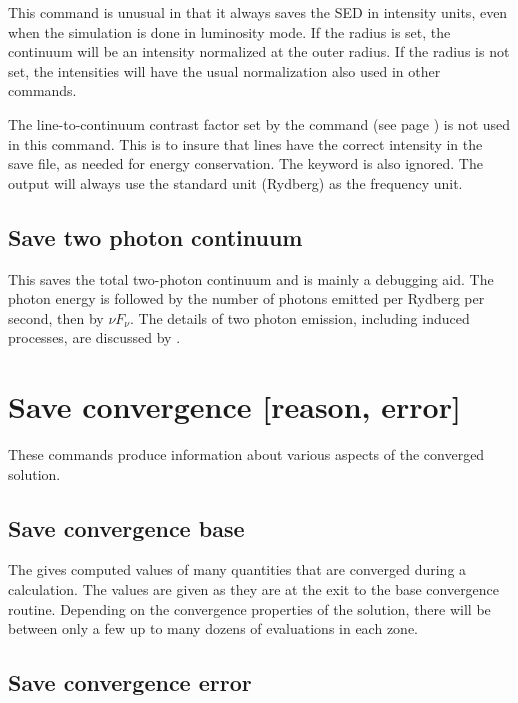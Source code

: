 This command is unusual in that it always saves the SED in intensity units,
even when the simulation is done in luminosity mode. If the radius is set, the
continuum will be an intensity normalized at the outer radius. If the radius
is not set, the intensities will have the usual normalization also used in
other  commands.

The line-to-continuum contrast factor 
set by the  command
(see page \pageref{sec:CommandSetSaveLWidth})
is not used in this command.  This is to insure that lines have
the correct intensity in the save file, as needed for energy conservation.
The  keyword is also ignored. The output will always use
the standard unit (Rydberg) as the frequency unit.

\subsection{Save two photon continuum}

This saves the total two-photon continuum and is mainly a debugging
aid.  The photon energy is followed by the number of photons emitted per
Rydberg per second, then by $\nu F_\nu$.  The details of two photon emission,
including induced processes, are discussed by \citet{Bottorff2006}.

\section{Save convergence [reason, error]}

These commands produce information about various aspects of the converged
solution.

\subsection{Save convergence base}

The gives computed values of many quantities that are converged during
a calculation.  The values are given as they are at the exit to the base
convergence routine.  Depending on the convergence properties of the
solution, there will be between only a few up to many
dozens of evaluations in each zone.

\subsection{Save convergence error}

